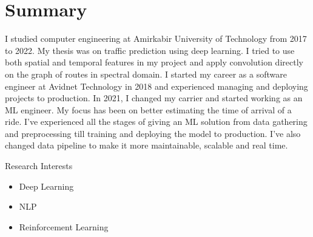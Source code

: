 \section{Summary}\closesection{}

I studied computer engineering at Amirkabir University of Technology from 2017 to 2022.
My thesis was on traffic prediction using deep learning.
I tried to use both spatial and temporal features in my project and apply
convolution directly on the graph of routes in spectral domain.
I started my career as a software engineer at Avidnet Technology in 2018 and experienced managing
and deploying projects to production.
In 2021, I changed my carrier and started working as an ML engineer.
My focus has been on better estimating the time of arrival of a ride.
I've experienced all the stages of giving an ML solution from data gathering and preprocessing
till training and deploying the model to production.
I've also changed data pipeline to make it more maintainable, scalable and real time.

\cventry
{}
{Research Interests}
{}
{}
{}
{}
\begin{itemize}
  \item Deep Learning
  \item NLP
  \item Reinforcement Learning
\end{itemize}
